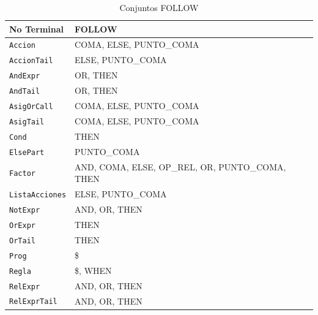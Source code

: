 \begin{table}[H]
\centering
\begin{tabular}{|l|l|}
\hline
\textbf{No Terminal} & \textbf{FOLLOW} \\ 
\hline
\texttt{Accion} & { COMA, ELSE, PUNTO_COMA } \\ 
\hline
\texttt{AccionTail} & { ELSE, PUNTO_COMA } \\ 
\hline
\texttt{AndExpr} & { OR, THEN } \\ 
\hline
\texttt{AndTail} & { OR, THEN } \\ 
\hline
\texttt{AsigOrCall} & { COMA, ELSE, PUNTO_COMA } \\ 
\hline
\texttt{AsigTail} & { COMA, ELSE, PUNTO_COMA } \\ 
\hline
\texttt{Cond} & { THEN } \\ 
\hline
\texttt{ElsePart} & { PUNTO_COMA } \\ 
\hline
\texttt{Factor} & { AND, COMA, ELSE, OP\_REL, OR, PUNTO_COMA, THEN } \\ 
\hline
\texttt{ListaAcciones} & { ELSE, PUNTO_COMA } \\ 
\hline
\texttt{NotExpr} & { AND, OR, THEN } \\ 
\hline
\texttt{OrExpr} & { THEN } \\ 
\hline
\texttt{OrTail} & { THEN } \\ 
\hline
\texttt{Prog} & { \$ } \\ 
\hline
\texttt{Regla} & { \$, WHEN } \\ 
\hline
\texttt{RelExpr} & { AND, OR, THEN } \\ 
\hline
\texttt{RelExprTail} & { AND, OR, THEN } \\ 
\hline
\end{tabular}
\caption{Conjuntos FOLLOW}
\label{tab:follow}
\end{table}
